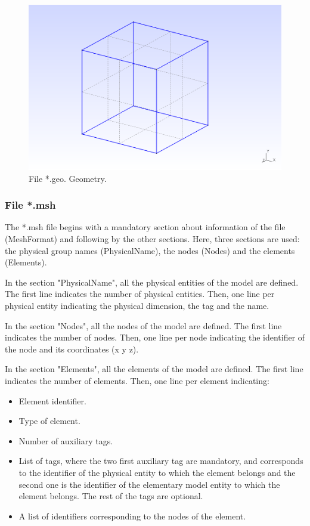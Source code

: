\documentclass[a4]{article}
\begin{document}
\begin{figure}[h]
	\centering
	\includegraphics[scale = 0.3]{geometry.png}
	\caption{File *.geo. Geometry.}
	\label{fig:geometry}
\end{figure}

\subsubsection{File *.msh}
The *.msh file begins with a mandatory section about information of the file (MeshFormat) and following by the other sections. Here, three sections are used: the physical group names (PhysicalName), the nodes (Nodes) and the elements (Elements).

In the section "PhysicalName", all the physical entities of the model are defined. The first line
indicates the number of physical entities. Then, one line per physical entity indicating the physical dimension, the tag and the name.  
   
In the section "Nodes", all the nodes of the model are defined. The first line indicates the number of nodes. Then, one line per node indicating the identifier of the node and its coordinates (x y z).

In the section "Elements", all the elements of the model are defined. The first line indicates the number of elements. Then, one line per element indicating:

\begin{itemize}
	\item Element identifier.
	\item Type of element.
	\item Number of auxiliary tags.
	\item List of tags, where the two first auxiliary tag are mandatory, and corresponds to the identifier of the physical entity to which the element belongs and the second one is the identifier of the elementary model entity to which the element belongs. The rest of the tags are optional.
	\item A list of identifiers corresponding to the nodes of the element.
\end{itemize}
\end{document}
